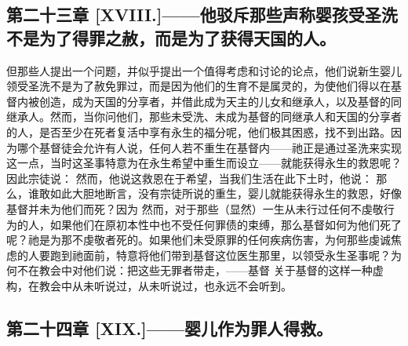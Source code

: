 
\subsection{第二十三章 [XVIII.]——他驳斥那些声称婴孩受圣洗不是为了得罪之赦，而是为了获得天国的人。}

但那些人提出一个问题，并似乎提出一个值得考虑和讨论的论点，他们说新生婴儿领受圣洗不是为了赦免罪过，而是因为他们的生育不是属灵的，为使他们得以在基督内被创造，成为天国的分享者，并借此成为天主的儿女和继承人，以及基督的同继承人。然而，当你问他们，那些未受洗、未成为基督的同继承人和天国的分享者的人，是否至少在死者复活中享有永生的福分呢，他们极其困惑，找不到出路。因为哪个基督徒会允许有人说，任何人若不重生在基督内——祂正是通过圣洗来实现这一点，当时这圣事特意为在永生希望中重生而设立——就能获得永生的救恩呢？因此宗徒说： 然而，他说这救恩在于希望，当我们生活在此下土时，他说： 那么，谁敢如此大胆地断言，没有宗徒所说的重生，婴儿就能获得永生的救恩，好像基督并未为他们而死？因为 然而，对于那些（显然）一生从未行过任何不虔敬行为的人，如果他们在原初本性中也不受任何罪债的束缚，那么基督如何为他们死了呢？祂是为那不虔敬者死的。如果他们未受原罪的任何疾病伤害，为何那些虔诚焦虑的人要跑到祂面前，特意将他们带到基督这位医生那里，以领受永生圣事呢？为何不在教会中对他们说：把这些无罪者带走，——基督  关于基督的这样一种虚构，在教会中从未听说过，从未听说过，也永远不会听到。\par


\subsection{第二十四章 [XIX.]——婴儿作为罪人得救。}

